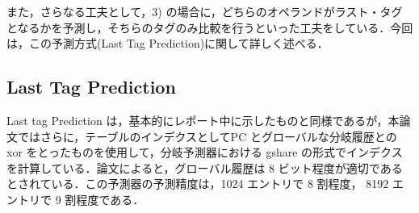 \documentclass[twocolumn]{jsarticle}
\begin{document}
  また，さらなる工夫として，3) の場合に，どちらのオペランドがラスト・タグとなるかを予測し，そちらのタグのみ比較を行うといった工夫をしている．今回は，この予測方式(Last Tag Prediction)に関して詳しく述べる．
  
  \subsection{Last Tag Prediction}
  Last tag Prediction は，基本的にレポート中に示したものと同様であるが，本論文ではさらに，テーブルのインデクスとしてPC とグローバルな分岐履歴との xor をとったものを使用して，分岐予測器における gshare の形式でインデクスを計算している．論文によると，グローバル履歴は 8 ビット程度が適切であるとされている．この予測器の予測精度は，1024 エントリで 8 割程度， 8192 エントリで 9 割程度である．

   
  
  
  
\end{document}
